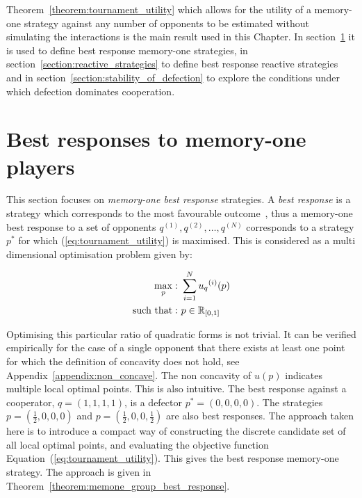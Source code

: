 Theorem~\ref{theorem:tournament_utility} which allows for the utility of a
memory-one strategy against any number of opponents to be estimated without
simulating the interactions is the main result used in this Chapter. In
section~\ref{section:best_response_mem_one} it is used to define best response
memory-one strategies, in section~\ref{section:reactive_strategies} to define best response
reactive strategies and in section~\ref{section:stability_of_defection}
to explore the conditions under which defection dominates cooperation.

\section{Best responses to memory-one players}\label{section:best_response_mem_one}

This section focuses on \textit{memory-one
best response} strategies. A \textit{best response} is a strategy which
corresponds to the most favourable outcome~\cite{Tadelis2013}, thus a memory-one
best response to a set of opponents \(q^{(1)}, q^{(2)}, \dots, q^{(N)}\) corresponds to a strategy \(p^*\) for which
(\ref{eq:tournament_utility}) is maximised. This is considered as a multi
dimensional optimisation problem given by:

\begin{equation}\label{eq:mo_tournament_optimisation}
    \begin{aligned}
    \max_p: & \ \sum_{i=1} ^ {N} {u_q}^{(i)} (p)
    \\
    \text{such that}: & \ p \in \mathbb{R}_{[0, 1]}
    \end{aligned}
\end{equation}

Optimising this particular ratio of quadratic forms is not trivial. It can be
verified empirically for the case of a single opponent that there exists at
least one point for which the definition of concavity does not hold, see Appendix~\ref{appendix:non_concave}.
The non concavity of \(u(p)\) indicates multiple local
optimal points. This is also intuitive. The best response against a cooperator,
\(q=(1, 1, 1, 1)\), is a defector \(p^*=(0, 0, 0, 0)\). The strategies
\(p=(\frac{1}{2}, 0, 0, 0)\) and \(p=(\frac{1}{2}, 0, 0, \frac{1}{2})\) are also
best responses. The approach taken here is to introduce a compact way of
constructing the discrete candidate set of all local optimal points, and evaluating
the objective function Equation~(\ref{eq:tournament_utility}). This gives the best
response memory-one strategy. The approach is given in
Theorem~\ref{theorem:memone_group_best_response}.

